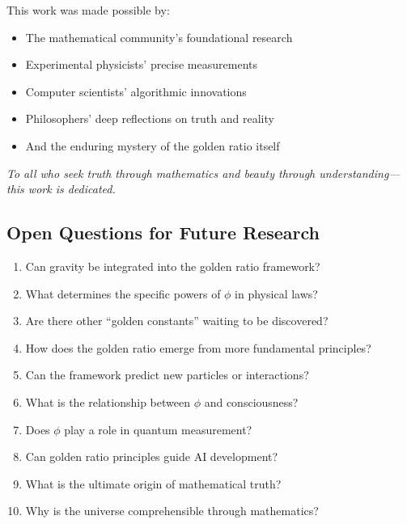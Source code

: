 This work was made possible by:
\begin{itemize}
    \item The mathematical community's foundational research
    \item Experimental physicists' precise measurements
    \item Computer scientists' algorithmic innovations
    \item Philosophers' deep reflections on truth and reality
    \item And the enduring mystery of the golden ratio itself
\end{itemize}

\textit{To all who seek truth through mathematics and beauty through understanding—this work is dedicated.}

\subsection*{Open Questions for Future Research}

\begin{enumerate}
    \item Can gravity be integrated into the golden ratio framework?
    \item What determines the specific powers of $\phi$ in physical laws?
    \item Are there other ``golden constants'' waiting to be discovered?
    \item How does the golden ratio emerge from more fundamental principles?
    \item Can the framework predict new particles or interactions?
    \item What is the relationship between $\phi$ and consciousness?
    \item Does $\phi$ play a role in quantum measurement?
    \item Can golden ratio principles guide AI development?
    \item What is the ultimate origin of mathematical truth?
    \item Why is the universe comprehensible through mathematics?
\end{enumerate}


